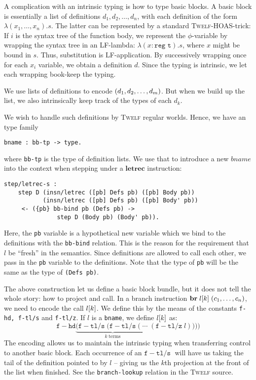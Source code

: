 \documentclass[a4paper, oneside, 10pt, final]{memoir}
\newcommand{\twelf}{\textsc{Twelf}}
\begin{document}
A complication with an intrinsic typing is how to type basic blocks. A
basic block is essentially a list of definitions $d_1, d_2, \dotsc,
d_n$, with each definition of the form $\lambda (x_1, \dotsc,
x_n).s$. The latter can be represented by a standard \twelf{}-HOAS-trick:
If $i$ is the syntax tree of the function body, we represent the
$\phi$-variable by wrapping the syntax tree in an LF-lambda: $\lambda
(x : \texttt{reg t}) . s$, where $x$ might be bound in $s$. Thus,
substitution is LF-application. By successively wrapping once for each
$x_i$ variable, we obtain a definition $d$. Since the typing is
intrinsic, we let each wrapping book-keep the typing.

We use lists of definitions to encode $(d_1, d_2, \dotsc, d_m)$. But when we build up
the list, we also intrinsically keep track of the types of each $d_k$.

We wish to handle such definitions by \twelf{} regular worlds. Hence,
we have an type family
\begin{verbatim}
bname : bb-tp -> type.
\end{verbatim}
where \texttt{bb-tp} is the type of definition lists. We use that to
introduce a new $bname$ into the context when stepping under a
$\mathbf{letrec}$ instruction:
\begin{verbatim}
step/letrec-s :
    step D (insn/letrec ([pb] Defs pb) ([pb] Body pb))
           (insn/letrec ([pb] Defs pb) ([pb] Body' pb))
     <- ({pb} bb-bind pb (Defs pb) ->
               step D (Body pb) (Body' pb)).
\end{verbatim}
Here, the \texttt{pb} variable is a hypothetical new variable which we
bind to the definitions with the \texttt{bb-bind} relation. This is
the reason for the requirement that $l$ be ``fresh'' in the
semantics. Since definitions are allowed to call each other, we pass
in the \texttt{pb} variable to the definitions. Note that the type of
\texttt{pb} will be the same as the type of \texttt{(Defs pb)}.

The above construction let us define a basic block bundle, but it does
not tell the whole story: how to project and call. In a branch
instruction $\mathbf{br} \; l[k] \; (c_1, \dotsc, c_n)$, we need to encode the
call $l[k]$. We define this by the means of the constants
\texttt{f-hd, f-tl/s} and \texttt{f-tl/z}. If $l$ is a
\texttt{bname}, we define $l[k]$ as:
\newcommand{\fhd}{\mathtt{f\!\!-\!\!hd}}
\newcommand{\ftls}{\mathtt{f\!\!-\!\!tl/s}\; }
\newcommand{\ftlz}[1]{(\mathtt{f\!\!-\!\!tl/z} \; #1)}
\begin{equation*}
  \fhd \underbrace{(\ftls(\ftls ( \; \dotsb \; }_{k \; \text{terms}}\ftlz{l})))
\end{equation*}
The encoding allows us to maintain the intrinsic typing when transferring
control to another basic block. Each occurrence of an $\ftls$ will
have us taking the tail of the definition pointed to by $l$ -- giving
us the $k$th projection at the front of the list when finished. See
the \texttt{branch-lookup} relation in the \twelf{} source.
\end{document}
